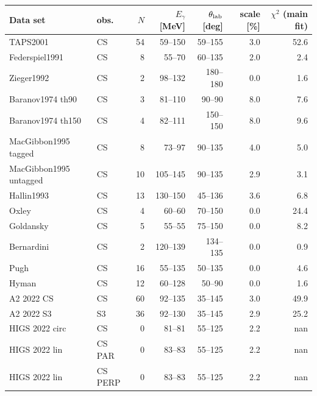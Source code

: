 \begin{tabular}{llrrrrr}
\hline
Data set & obs. & $N$ & $E_\gamma$ [MeV] & $\theta_{\rm lab}$ [deg] & scale [\%] & $\chi^2$ (main fit)\\\hline
TAPS2001 \cite{OlmosdeLeon:2001zn} & CS & 54 & 59--150 & 59--155 & 3.0 & 52.6\\
Federspiel1991 \cite{Federspiel:1991yd} & CS & 8 & 55--70 & 60--135 & 2.0 & 2.4\\
Zieger1992 \cite{Zieger:1992jq} & CS & 2 & 98--132 & 180--180 & 0.0 & 1.6\\
Baranov1974 th90 \cite{Baranov:1974ec} & CS & 3 & 81--110 & 90--90 & 8.0 & 7.6\\
Baranov1974 th150 \cite{Baranov:1974ec} & CS & 4 & 82--111 & 150--150 & 8.0 & 9.6\\
MacGibbon1995 tagged \cite{MacGibbon:1995in} & CS & 8 & 73--97 & 90--135 & 4.0 & 5.0\\
MacGibbon1995 untagged \cite{MacGibbon:1995in} & CS & 10 & 105--145 & 90--135 & 2.9 & 3.1\\
Hallin1993 \cite{Hallin:1993ft} & CS & 13 & 130--150 & 45--136 & 3.6 & 6.8\\
Oxley \cite{Oxley:1958zz} & CS & 4 & 60--60 & 70--150 & 0.0 & 24.4\\
Goldansky \cite{Goldansky:1960zz} & CS & 5 & 55--55 & 75--150 & 0.0 & 8.2\\
Bernardini \cite{Bernardini:1960wya} & CS & 2 & 120--139 & 134--135 & 0.0 & 0.9\\
Pugh \cite{Pugh:1957zz} & CS & 16 & 55--135 & 50--135 & 0.0 & 4.6\\
Hyman \cite{Hyman:1959zz} & CS & 12 & 60--128 & 50--90 & 0.0 & 1.6\\
A2 2022 CS \cite{A2:2021wmm} & CS & 60 & 92--135 & 35--145 & 3.0 & 49.9\\
A2 2022 S3 \cite{A2:2021wmm} & S3 & 36 & 92--130 & 35--145 & 2.9 & 25.2\\
HIGS 2022 circ \cite{Li:2022vnz} & CS & 0 & 81--81 & 55--125 & 2.2 & nan\\
HIGS 2022 lin \cite{Li:2022vnz} & CS PAR & 0 & 83--83 & 55--125 & 2.2 & nan\\
HIGS 2022 lin \cite{Li:2022vnz} & CS PERP & 0 & 83--83 & 55--125 & 2.2 & nan\\
\hline
\end{tabular}

